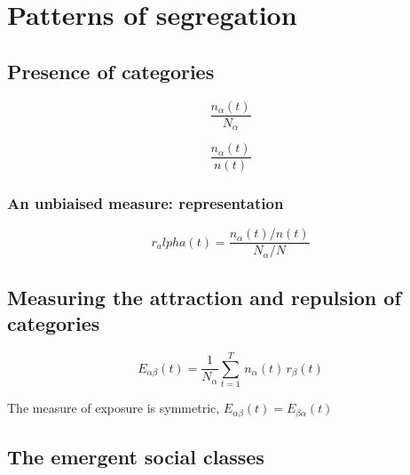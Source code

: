 %
\chapter{Patterns of segregation}
\label{sec:concepts}


\section{Presence of categories}
\label{sec:presence_of_categories}

\begin{equation}
    \frac{n_\alpha(t)}{N_\alpha}
\end{equation}


\begin{equation}
    \frac{n_\alpha(t)}{n(t)}
\end{equation}

\subsection{An unbiaised measure: representation}
\label{sub:an_unbiaised_measure_the_representation}

\begin{equation}
    r_alpha(t) = \frac{n_\alpha(t)/n(t)}{N_\alpha/N}
\end{equation}

\section{Measuring the attraction and repulsion of categories}
\label{sec:measuring_the_attraction_and_repulsion_of_categories}

\begin{equation}
    E_{\alpha \beta}(t) = \frac{1}{N_\alpha}
    \sum_{t=1}^T\,n_\alpha(t)\,r_\beta(t) 
\end{equation}

The measure of exposure is symmetric, $E_{\alpha \beta}(t) = E_{\beta \alpha}(t)$

\section{The emergent social classes}
\label{sec:the_emergent_social_classes}


